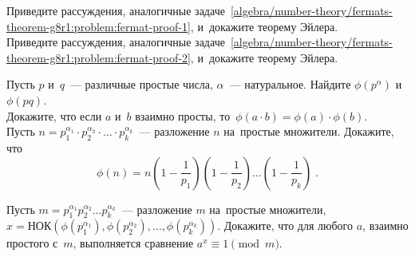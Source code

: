 \begin{problems}

\item
\subproblem
Приведите рассуждения, аналогичные
задаче~\ref{algebra/number-theory/fermats-theorem-g8r1:problem:fermat-proof-1},
и~докажите теорему Эйлера.
\\
\subproblem
Приведите рассуждения, аналогичные
задаче~\ref{algebra/number-theory/fermats-theorem-g8r1:problem:fermat-proof-2},
и~докажите теорему Эйлера.

\item
\subproblem
Пусть $p$ и~$q$~--- различные простые числа, $\alpha$~--- натуральное.
Найдите $\phi(p^\alpha)$ и~$\phi(p q)$.
\\
\subproblem
Докажите, что если $a$ и~$b$ взаимно просты,
то~$\phi(a \cdot b) = \phi(a) \cdot \phi(b)$.
\\
\subproblem
Пусть
\(
    n
=
    p_1^{\alpha_1} \cdot p_2^{\alpha_2} \cdot \ldots \cdot p_k^{\alpha_k}
\)~---
разложение $n$ на~простые множители.
Докажите, что
\[
    \phi(n)
=
    n
    \left(
        1 - \frac{1}{p_1}
    \right)
    \left(
        1 - \frac{1}{p_2}
    \right)
    \ldots
    \left(
        1 - \frac{1}{p_k}
    \right)
\;.\]

\item
{}
Пусть $m = p_1^{\alpha_1} p_2^{\alpha_2} \ldots p_k^{\alpha_k}$~--- разложение
$m$ на~простые множители,
\(
    x
=
    \text{НОК}(
        \phi(p_1^{\alpha_1}),
        \phi(p_2^{\alpha_2}),
        \ldots,
        \phi(p_k^{\alpha_k})
    )
\).
Докажите, что для любого $a$, взаимно простого с~$m$, выполняется сравнение
$a^x \equiv 1 \pmod m$.

\end{problems}

